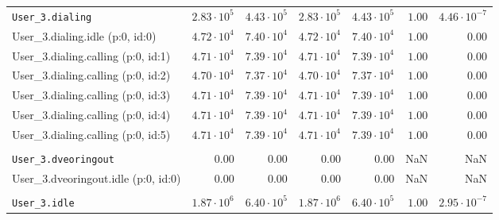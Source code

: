 \begin{table}[htbp]
{\begin{tabular}{lrrrrrr}
\\[-8pt]\texttt{User\_3.dialing}                      & $2.83 \cdot 10^{5}$ & $4.43 \cdot 10^{5}$ & $2.83 \cdot 10^{5}$ & $4.43 \cdot 10^{5}$ &               $1.00$ & $4.46 \cdot 10^{-7}$ \\
\hspace{3mm}User\_3.dialing.idle (p:0, id:0)          & $4.72 \cdot 10^{4}$ & $7.40 \cdot 10^{4}$ & $4.72 \cdot 10^{4}$ & $7.40 \cdot 10^{4}$ &               $1.00$ &               $0.00$ \\
\hspace{3mm}User\_3.dialing.calling (p:0, id:1)       & $4.71 \cdot 10^{4}$ & $7.39 \cdot 10^{4}$ & $4.71 \cdot 10^{4}$ & $7.39 \cdot 10^{4}$ &               $1.00$ &               $0.00$ \\
\hspace{3mm}User\_3.dialing.calling (p:0, id:2)       & $4.70 \cdot 10^{4}$ & $7.37 \cdot 10^{4}$ & $4.70 \cdot 10^{4}$ & $7.37 \cdot 10^{4}$ &               $1.00$ &               $0.00$ \\
\hspace{3mm}User\_3.dialing.calling (p:0, id:3)       & $4.71 \cdot 10^{4}$ & $7.39 \cdot 10^{4}$ & $4.71 \cdot 10^{4}$ & $7.39 \cdot 10^{4}$ &               $1.00$ &               $0.00$ \\
\hspace{3mm}User\_3.dialing.calling (p:0, id:4)       & $4.71 \cdot 10^{4}$ & $7.39 \cdot 10^{4}$ & $4.71 \cdot 10^{4}$ & $7.39 \cdot 10^{4}$ &               $1.00$ &               $0.00$ \\
\hspace{3mm}User\_3.dialing.calling (p:0, id:5)       & $4.71 \cdot 10^{4}$ & $7.39 \cdot 10^{4}$ & $4.71 \cdot 10^{4}$ & $7.39 \cdot 10^{4}$ &               $1.00$ &               $0.00$ \\
\\[-8pt]\texttt{User\_3.dveoringout}                  &              $0.00$ &              $0.00$ &              $0.00$ &              $0.00$ &                  NaN &                  NaN \\
\hspace{3mm}User\_3.dveoringout.idle (p:0, id:0)      &              $0.00$ &              $0.00$ &              $0.00$ &              $0.00$ &                  NaN &                  NaN \\
\\[-8pt]\texttt{User\_3.idle}                         & $1.87 \cdot 10^{6}$ & $6.40 \cdot 10^{5}$ & $1.87 \cdot 10^{6}$ & $6.40 \cdot 10^{5}$ &               $1.00$ & $2.95 \cdot 10^{-7}$ \\

\end{tabular}}
\end{table}
